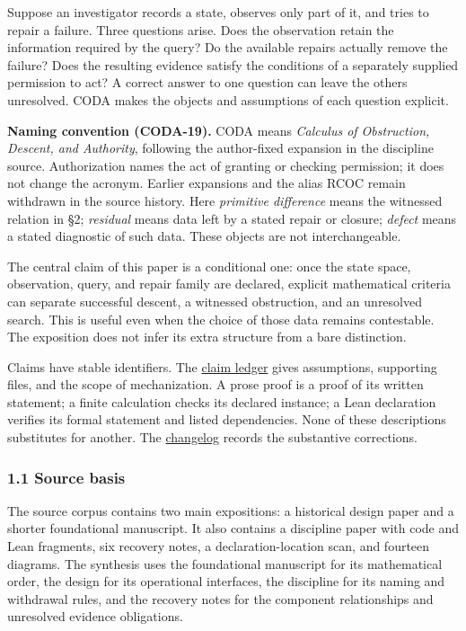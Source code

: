 \documentclass[
  11pt,
]{article}
\begin{document}
Suppose an investigator records a state, observes only part of it, and tries to repair a failure. Three questions arise. Does the observation retain the information required by the query? Do the available repairs actually remove the failure? Does the resulting evidence satisfy the conditions of a separately supplied permission to act? A correct answer to one question can leave the others unresolved. CODA makes the objects and assumptions of each question explicit.

\textbf{Naming convention (CODA-19).} CODA means \emph{Calculus of Obstruction, Descent, and Authority}, following the author-fixed expansion in the discipline source. Authorization names the act of granting or checking permission; it does not change the acronym. Earlier expansions and the alias RCOC remain withdrawn in the source history. Here \emph{primitive difference} means the witnessed relation in §2; \emph{residual} means data left by a stated repair or closure; \emph{defect} means a stated diagnostic of such data. These objects are not interchangeable.

The central claim of this paper is a conditional one: once the state space, observation, query, and repair family are declared, explicit mathematical criteria can separate successful descent, a witnessed obstruction, and an unresolved search. This is useful even when the choice of those data remains contestable. The exposition does not infer its extra structure from a bare distinction.

Claims have stable identifiers. The \href{coda_claim_ledger.md}{claim ledger} gives assumptions, supporting files, and the scope of mechanization. A prose proof is a proof of its written statement; a finite calculation checks its declared instance; a Lean declaration verifies its formal statement and listed dependencies. None of these descriptions substitutes for another. The \href{coda_change_log.md}{changelog} records the substantive corrections.

\subsubsection{1.1 Source basis}\label{source-basis}

The source corpus contains two main expositions: a historical design paper and a shorter foundational manuscript. It also contains a discipline paper with code and Lean fragments, six recovery notes, a declaration-location scan, and fourteen diagrams. The synthesis uses the foundational manuscript for its mathematical order, the design for its operational interfaces, the discipline for its naming and withdrawal rules, and the recovery notes for the component relationships and unresolved evidence obligations.
\end{document}
